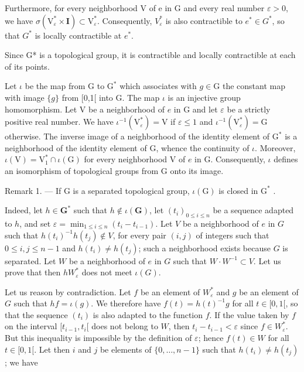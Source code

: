 Furthermore, for every neighborhood V of e in G and every real number \(\varepsilon > 0\), we have \(\sigma(\mathrm{V}_{\varepsilon}^{*} \times \mathbf{I}) \subset \mathrm{V}_{\varepsilon}^{*}\). Consequently, \(V_{\varepsilon}^{*}\) is also contractible to \(e^{*} \in G^{*}\), so that \(G^{*}\) is locally contractible at \(e^{*}\).

Since G* is a topological group, it is contractible and locally contractible at each of its points.

Let \(\iota\) be the map from G to \(\mathrm{G}^*\) which associates with \(g\in \mathrm{G}\) the constant map with image \(\{g\}\) from [0,1[ into G. The map \(\iota\) is an injective group homomorphism. Let V be a neighborhood of \(e\) in G and let \(\varepsilon\) be a strictly positive real number. We have \(\iota^{-1}(\mathrm{V}_{\varepsilon}^{*}) = \mathrm{V}\) if \(\varepsilon \leqslant 1\) and \(\iota^{-1}(\mathrm{V}_{\varepsilon}^{*}) = \mathrm{G}\) otherwise. The inverse image of a neighborhood of the identity element of \(\mathrm{G}^*\) is a neighborhood of the identity element of G, whence the continuity of \(\iota\). Moreover, \(\iota(\mathrm{V}) = \mathrm{V}_1^* \cap \iota(\mathrm{G})\) for every neighborhood V of \(e\) in G. Consequently, \(\iota\) defines an isomorphism of topological groups from G onto its image.

Remark 1. --- If G is a separated topological group, \(\iota(\mathrm{G})\) is closed in \(\mathrm{G}^*\) .

Indeed, let \(h \in \mathbf{G}^*\) such that \(h \notin \iota(\mathbf{G})\), let \((t_i)_{0 \leqslant i \leqslant n}\) be a sequence adapted to \(h\), and set \(\varepsilon = \min_{1 \leqslant i \leqslant n} (t_i - t_{i-1})\). Let \(V\) be a neighborhood of \(e\) in \(G\) such that \(h(t_i)^{-1}h(t_j) \notin V\), for every pair \((i,j)\) of integers such that \(0 \leqslant i, j \leqslant n-1\) and \(h(t_i) \neq h(t_j)\); such a neighborhood exists because \(G\) is separated. Let \(W\) be a neighborhood of \(e\) in \(G\) such that \(W \cdot W^{-1} \subset V\). Let us prove that then \(hW_\varepsilon^*\) does not meet \(\iota(G)\).

Let us reason by contradiction. Let \(f\) be an element of \(W_{\varepsilon}^{*}\) and \(g\) be an element of \(G\) such that \(hf = \iota(g)\). We therefore have \(f(t) = h(t)^{-1}g\) for all \(t \in [0,1[\), so that the sequence \((t_i)\) is also adapted to the function \(f\). If the value taken by \(f\) on the interval \([t_{i-1}, t_i[\) does not belong to \(W\), then \(t_i - t_{i-1} < \varepsilon\) since \(f \in W_{\varepsilon}^{*}\). But this inequality is impossible by the definition of \(\varepsilon\); hence \(f(t) \in W\) for all \(t \in [0,1[\). Let then \(i\) and \(j\) be elements of \(\{0, \ldots, n-1\}\) such that \(h(t_i) \neq h(t_j)\); we have


